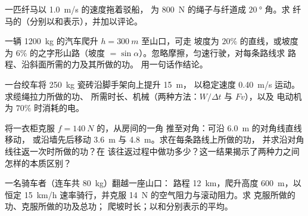 \begin{exercise}[$\star\star$]\label{exo:g11:work-of-force:11}
一匹纤马以 \qty{1.0}{m/s} 的速度拖着驳船，
为 \qty{800}{N} 的绳子与纤道成 $\qty{20}{\degree}$ 角。求
纤马的（分别以和表示），并加以评论。
\end{exercise}

\begin{exercise}[$\star\star\star$]\label{exo:g11:work-of-force:12}
一辆 \qty{1200}{kg} 的汽车爬升 $h = \qty{300}{m}$ 至山口，可走
坡度为 $20\%$ 的直线，或坡度为 $6\%$ 的之字形山路（坡度 $=
\sin\alpha$）。忽略摩擦，匀速行驶，对每条路线求
路程、沿斜面所需的力及其所做的功。
用一句话作结论。
\end{exercise}

\begin{exercise}[$\star\star\star$]\label{exo:g11:work-of-force:13}
一台绞车将 \qty{250}{kg} 瓷砖沿脚手架向上提升 \qty{15}{m}，
以稳定速度 \qty{0.40}{m/s} 运动。求缆绳拉力所做的功、
所需时长、机械（两种方法：$W/\Delta t$ 与 $Fv$），以及
电动机为 $70\%$ 时消耗的电。
\end{exercise}

\begin{exercise}[$\star\star\star$]\label{exo:g11:work-of-force:14}
将一衣柜克服 $f = \qty{140}{N}$ 的，从房间的一角
推至对角：可沿 \qty{6.0}{m} 的对角线直线移动，
或沿墙先后移动 \qty{3.6}{m} 与 \qty{4.8}{m}。求在每条路线上所做的功，
并求沿对角线往返一次时所做的功？在
该往返过程中做功多少？这一结果揭示了两种力之间
怎样的本质区别？
\end{exercise}

\begin{exercise}[$\star\star\star$]\label{exo:g11:work-of-force:15}
一名骑车者（连车共 \qty{80}{kg}）翻越一座山口：
路程 \qty{12}{km}，爬升高度 \qty{600}{m}，以恒定 \qty{15}{km/h}
速率骑行，并克服 \qty{14}{N} 的空气阻力与滚动阻力。求
克服所做的功、克服所做的功及总功；
爬坡时长；以和分别表示的平均。
\end{exercise}

